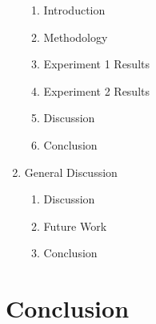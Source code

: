 \documentclass[10pt, letterpaper, twoside, openany]{book}
\begin{document}
\begin{enumerate}
	\begin{enumerate}
		\item Introduction
		\item Methodology
		\item Experiment 1 Results
		\item Experiment 2 Results
		\item Discussion
		\item Conclusion
	\end{enumerate}
	\item General Discussion
	\begin{enumerate}
		\item Discussion
		\item Future Work
		\item Conclusion
	\end{enumerate}
\end{enumerate}

\chapter{Conclusion}



\end{document}
